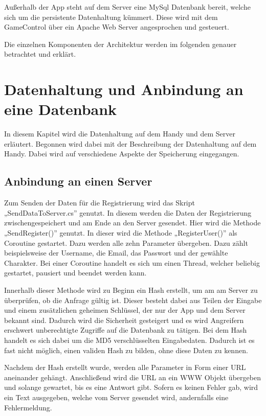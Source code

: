 		Außerhalb der App steht auf dem Server eine MySql Datenbank bereit, welche sich um die persistente Datenhaltung kümmert. Diese wird mit dem GameControl über ein Apache Web Server angesprochen und gesteuert.
		
		Die einzelnen Komponenten der Architektur werden im folgenden genauer betrachtet und erklärt.

	\section{Datenhaltung und Anbindung an eine Datenbank}
		In diesem Kapitel wird die Datenhaltung auf dem Handy und dem Server erläutert. Begonnen wird dabei mit der Beschreibung der Datenhaltung auf dem Handy. Dabei wird auf verschiedene Aspekte der Speicherung eingegangen.
		
		\subsection{Anbindung an einen Server}
			Zum Senden der Daten für die Registrierung wird das Skript „SendDataToServer.cs” genutzt. In diesem werden die Daten der Registrierung zwischengespeichert und am Ende an den Server gesendet. Hier wird die Methode „SendRegister()” genutzt. In dieser wird die Methode „RegisterUser()” als Coroutine gestartet. Dazu werden alle zehn Parameter übergeben. Dazu zählt beispielsweise der Username, die Email, das Passwort und der gewählte Charakter. Bei einer Coroutine handelt es sich um einen Thread, welcher beliebig gestartet, pausiert und beendet werden kann.

			Innerhalb dieser Methode wird zu Beginn ein Hash erstellt, um am am Server zu überprüfen, ob die Anfrage gültig ist. Dieser besteht dabei aus Teilen der Eingabe und einem zusätzlichen geheimen Schlüssel, der nur der App und dem Server bekannt sind. Dadurch wird die Sicherheit gesteigert und es wird Angreifern erschwert unberechtigte Zugriffe auf die Datenbank zu tätigen. Bei dem Hash handelt es sich dabei um die MD5 verschlüsselten Eingabedaten. Dadurch ist es fast nicht möglich, einen validen Hash zu bilden, ohne diese Daten zu kennen.

			Nachdem der Hash erstellt wurde, werden alle Parameter in Form einer URL aneinander gehängt. Anschließend wird die URL an ein WWW Objekt übergeben und solange gewartet, bis es eine Antwort gibt. Sofern es keinen Fehler gab, wird ein Text ausgegeben, welche vom Server gesendet wird, andernfalls eine Fehlermeldung.

